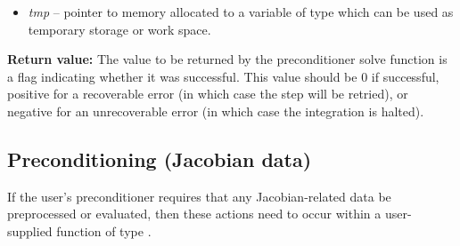 \documentclass[letterpaper,10pt,english]{sphinxmanual}
\begin{document}
\begin{fulllineitems}
\begin{description}
\begin{itemize}
\item {} 
\emph{tmp} -- pointer to memory allocated to a variable of type
 which can be used as temporary storage or work space.

\end{itemize}

\end{description}

\textbf{Return value:}
The value to be returned by the preconditioner solve
function is a flag indicating whether it was successful. This value
should be 0 if successful, positive for a recoverable error (in
which case the step will be retried), or negative for an
unrecoverable error (in which case the integration is halted).

\end{fulllineitems}



\subsection{Preconditioning (Jacobian data)}
\label{c_interface/User_supplied:cinterface-precsetupfn}\label{c_interface/User_supplied:preconditioning-jacobian-data}
If the user's preconditioner requires that any Jacobian-related data
be preprocessed or evaluated, then these actions need to occur within
a user-supplied function of type {\hyperref[c_interface/User_supplied:c.ARKSpilsPrecSetupFn]{\emph{}}}.
\end{document}
